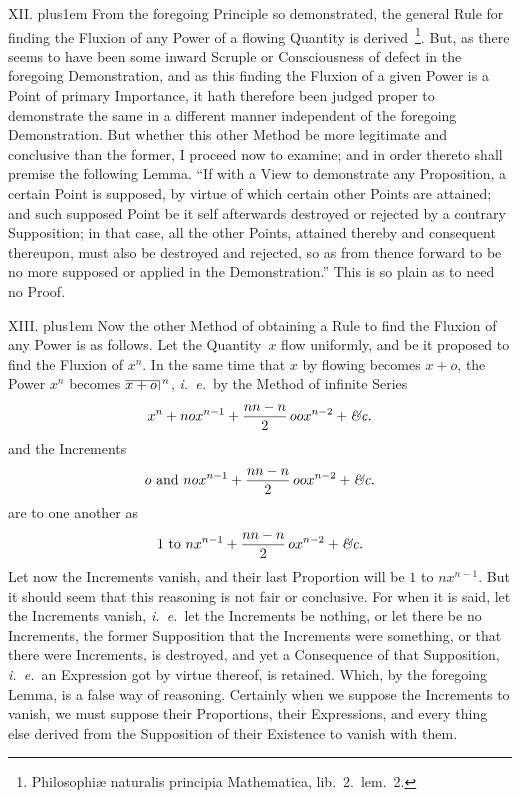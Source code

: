 \medbreak

XII. \hskip 0pt plus1em
From the foregoing Principle so demonstrated, the general Rule
for finding the Fluxion of any Power of a flowing Quantity is
derived~\footnote*{Philosophi{\ae} naturalis principia
Mathematica, lib.~2.\ lem.~2.}.
But, as there seems to have been some inward Scruple or
Consciousness of defect in the foregoing Demonstration, and as
this finding the Fluxion of a given Power is a Point of primary
Importance, it hath therefore been judged proper to demonstrate
the same in a different manner independent of the foregoing
Demonstration.  But whether this other Method be more legitimate
and conclusive than the former, I proceed now to examine; and in
order thereto shall premise the following Lemma.  ``If with a
View to demonstrate any Proposition, a certain Point is supposed,
by virtue of which certain other Points are attained; and such
supposed Point be it self afterwards destroyed or rejected by a
contrary Supposition; in that case, all the other Points,
attained thereby and consequent thereupon, must also be destroyed
and rejected, so as from thence forward to be no more supposed or
applied in the Demonstration.''  This is so plain as to need no
Proof.

\medbreak

XIII. \hskip 0pt plus1em
Now the other Method of obtaining a Rule to find the Fluxion of
any Power is as follows.  Let the Quantity~$x$ flow uniformly,
and be it proposed to find the Fluxion of $x^n$.  In the same
time that $x$ by flowing becomes $x + o$, the Power $x^n$ becomes
$\mathord{\vbox{\hrule\hbox{$x + o \,$\vrule}}\,}^n$,
{\it i.~e.}\ by the Method of infinite Series
$$x^n + nox^{n-1} + {nn-n \over 2} \, oox^{n-2}
   + \hbox{\it \&c.}$$
and the Increments
$$o \hbox{ and }
   nox^{n-1} + {nn-n \over 2} \, oox^{n-2} + \hbox{\it \&c.}$$
are to one another as
$$1 \hbox{ to }
   nx^{n-1} + {nn-n \over 2} \, ox^{n-2} + \hbox{\it \&c.}$$
Let now the Increments vanish, and their last Proportion will be
$1$ to $nx^{n-1}$.  But it should seem that this reasoning is not
fair or conclusive.  For when it is said, let the Increments
vanish, {\it i.~e.}\ let the Increments be nothing, or let there
be no Increments, the former Supposition that the Increments were
something, or that there were Increments, is destroyed, and yet a
Consequence of that Supposition, {\it i.~e.}\ an Expression got
by virtue thereof, is retained.  Which, by the foregoing Lemma,
is a false way of reasoning.  Certainly when we suppose the
Increments to vanish, we must suppose their Proportions, their
Expressions, and every thing else derived from the Supposition of
their Existence to vanish with them.

